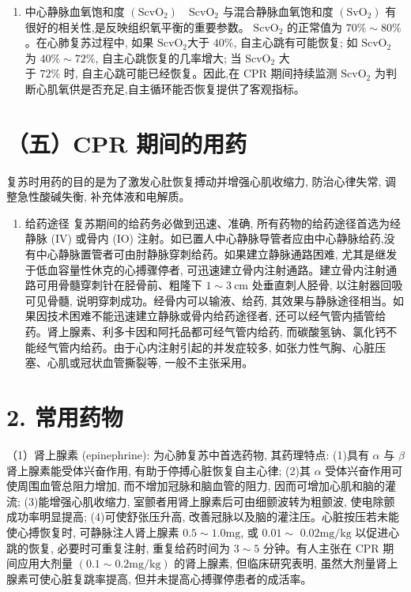 \documentclass[10pt]{article}
\begin{document}
\begin{enumerate}
  \item 中心静脉血氧饱和度 $\left(\mathrm{ScvO}_{2}\right) \quad \mathrm{ScvO}_{2}$ 与混合静脉血氧饱和度 $\left(\mathrm{SvO}_{2}\right)$ 有很好的相关性,是反映组织氧平衡的重要参数。 $\mathrm{ScvO}_{2}$ 的正常值为 $70 \% \sim 80 \%$ 。在心肺复苏过程中, 如果 $\mathrm{ScvO}_{2}$大于 $40 \%$, 自主心跳有可能恢复; 如 $\mathrm{ScvO}_{2}$ 为 $40 \% \sim 72 \%$, 自主心跳恢复的几率增大; 当 $\mathrm{ScvO}_{2}$ 大\\
于 $72 \%$ 时, 自主心跳可能已经恢复。因此,在 $\mathrm{CPR}$ 期间持续监测 $\mathrm{ScvO}_{2}$ 为判断心肌氧供是否充足,自主循环能否恢复提供了客观指标。

\end{enumerate}

\section*{（五）CPR 期间的用药}
复苏时用药的目的是为了激发心肚恢复搏动并增强心肌收缩力, 防治心律失常, 调整急性酸碱失衡, 补充体液和电解质。

\begin{enumerate}
  \item 给药途径 复苏期间的给药务必做到迅速、准确, 所有药物的给药途径首选为经静脉 (IV) 或骨内 (IO) 注射。如已置人中心静脉导管者应由中心静脉给药,没有中心静脉置管者可由肘静脉穿刺给药。如果建立静脉通路困难, 尤其是继发于低血容量性休克的心搏骤停者, 可迅速建立骨内注射通路。建立骨内注射通路可用骨髓穿刺针在胫骨前、粗隆下 $1 \sim 3 \mathrm{~cm}$ 处垂直刺人胫骨, 以注射器回吸可见骨髓, 说明穿刺成功。经骨内可以输液、给药, 其效果与静脉途径相当。如果因技术困难不能迅速建立静脉或骨内给药途径者, 还可以经气管内插管给药。肾上腺素、利多卡因和阿托品都可经气管内给药, 而碳酸氢钠、氯化钙不能经气管内给药。由于心内注射引起的并发症较多, 如张力性气胸、心脏压塞、心肌或冠状血管撕裂等, 一般不主张采用。
\end{enumerate}

\section*{2. 常用药物}
（1）肾上腺素 (epinephrine): 为心肺复苏中首选药物, 其药理特点: (1)具有 $\alpha$ 与 $\beta$ 肾上腺素能受体兴奋作用, 有助于停搏心脏恢复自主心律; (2)其 $\alpha$ 受体兴奋作用可使周围血管总阻力增加, 而不增加冠脉和脑血管的阻力, 因而可增加心肌和脑的灌流; (3)能增强心肌收缩力, 室颤者用肾上腺素后可由细颤波转为粗颤波, 使电除颤成功率明显提高; (4)可使舒张压升高, 改善冠脉以及脑的灌注压。心脏按压若未能使心搏恢复时, 可静脉注人肾上腺素 $0.5 \sim 1.0 \mathrm{mg}$, 或 $0.01 \sim$ $0.02 \mathrm{mg} / \mathrm{kg}$ 以促进心跳的恢复, 必要时可重复注射, 重复给药时间为 $3 \sim 5$ 分钟。有人主张在 CPR 期间应用大剂量 $(0.1 \sim 0.2 \mathrm{mg} / \mathrm{kg})$ 的肾上腺素, 但临床研究表明, 虽然大剂量肾上腺素可使心脏复跳率提高, 但并未提高心搏骤停患者的成活率。
\end{document}
